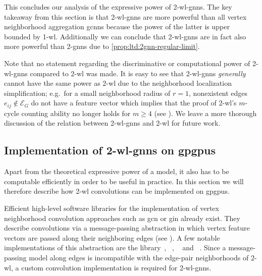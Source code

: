 This concludes our analysis of the expressive power of 2-\acs{wl}-\acsp{gnn}.
The key takeaway from this section is that 2-\acs{wl}-\acsp{gnn} are more powerful than all vertex neighborhood aggregation \acp{gcnn} because the power of the latter is upper bounded by 1-\acs{wl}.
Additionally we can conclude that 2-\acs{wl}-\acsp{gnn} are in fact also more powerful than 2-\acsp{gnn} due to \cref{prop:ltd:2gnn-regular-limit}.

Note that no statement regarding the discriminative or computational power of 2-\acs{wl}-\acsp{gnn} compared to 2-\acs{wl} was made.
It is easy to see that 2-\acs{wl}-\acsp{gnn} \textit{generally} cannot have the same power as 2-\acs{wl} due to the neighborhood localization simplification;
e.g.\ for a small neighborhood radius of $r = 1$, nonexistent edges $e_{ij} \notin \mathcal{E}_G$ do not have a feature vector which implies that the proof of 2-\acs{wl}'s $m$-cycle counting ability no longer holds for $m \geq 4$ (see ).
We leave a more thorough discussion of the relation between 2-\acs{wl}-\acsp{gnn} and 2-\acs{wl} for future work.

\subsection{Implementation of 2-\acs*{wl}-\acsp*{gnn} on \acsp*{gpgpu}}%
\label{sec:ltd:wl2gnn:implementation}

Apart from the theoretical expressive power of a model, it also has to be computable efficiently in order to be useful in practice.
In this section we will therefore describe how 2-\acs{wl} convolutions can be implemented on \acfp{gpgpu}.

Efficient high-level software libraries for the implementation of vertex neighborhood convolution approaches such as \ac{gcn} or \ac{gin} already exist.
They describe convolutions via a message-passing abstraction in which vertex feature vectors are passed along their neighboring edges (see \citet{Battaglia2018}).
A few notable implementations of this abstraction are the  library~\cite{GN}, ~\cite{Fey2019}\cite{PyG}, ~\cite{Wang2019}\cite{DGL} and ~\cite{Spektral}.
Since a message-passing model along edges is incompatible with the edge-pair neighborhoods of 2-\acs{wl}, a custom convolution implementation is required for 2-\acs{wl}-\acsp{gnn}.

